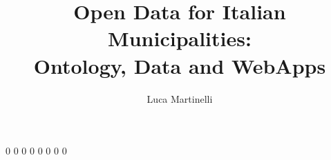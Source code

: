 \documentclass[watermark,dedication,figures,tables,codes,acronyms,acknowledgments]{DEIThesis}
\title{Open Data for Italian Municipalities: \\ Ontology, Data and WebApps}
\author{Luca Martinelli}
\begin{document}
    \frontmatter

    \mainmatter
    
    {0}
    {0}
    {0}
    {0}
    {0}
    {0}
    {0}
    {0}
    
    \backmatter
\end{document}
